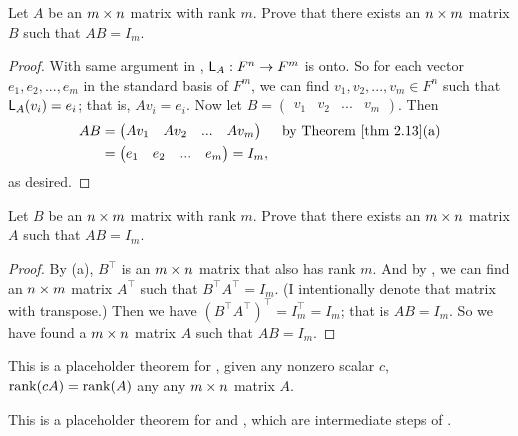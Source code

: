 \begin{exercise} \label{exercise 3.2.21}
Let \(A\) be an \(m \times n\) matrix with rank \(m\).
Prove that there exists an \(n \times m\) matrix \(B\) such that \(AB = I_m\).
\end{exercise}

\begin{proof}
With same argument in , \(\textsf{L}_A : F^n \to F^m\) is onto.
So for each vector \(e_1, e_2, ..., e_m\) in the standard basis of \(F^m\), we can find \(v_1, v_2, ..., v_m \in F^n\) such that \(\textsf{L}_A(v_i) = e_i\);
that is, \(A v_i = e_i\).
Now let \(B = \begin{pmatrix} v_1 & v_2 & ... & v_m \end{pmatrix}\).
Then
\begin{align*}
    AB & = \begin{pmatrix} A v_1 & A v_2 & ... & A v_m \end{pmatrix} & \text{by \THM{2.13}(a)} \\
       & = \begin{pmatrix} e_1 & e_2 & ... & e_m \end{pmatrix} = I_m,
\end{align*}
as desired.
\end{proof}

\begin{exercise} \label{exercise 3.2.22}
Let \(B\) be an \(n \times m\) matrix with rank \(m\).
Prove that there exists an \(m \times n\) matrix \(A\) such that \(AB = I_m\).
\end{exercise}

\begin{proof}
By (a), \(B^\top\) is an \(m \times n\) matrix that also has rank \(m\).
And by , we can find an \(n \times m\) matrix \(A^\top\) such that \(B^\top A^\top = I_m\).
(I intentionally denote that matrix with transpose.)
Then we have \((B^\top A^\top)^\top = I_m^\top = I_m\);
that is \(A B = I_m\).
So we have found a \(m \times n\) matrix \(A\) such that \(A B = I_m\).
\end{proof}

\begin{additional theorem} \label{athm 3.4}
This is a placeholder theorem for , given any nonzero scalar \(c\), \(\mathrm{rank}(cA) = \mathrm{rank}(A)\) any any \(m \times n\) matrix \(A\).
\end{additional theorem}

\begin{additional theorem} \label{athm 3.5}
This is a placeholder theorem for  and , which are intermediate steps of .
\end{additional theorem}

